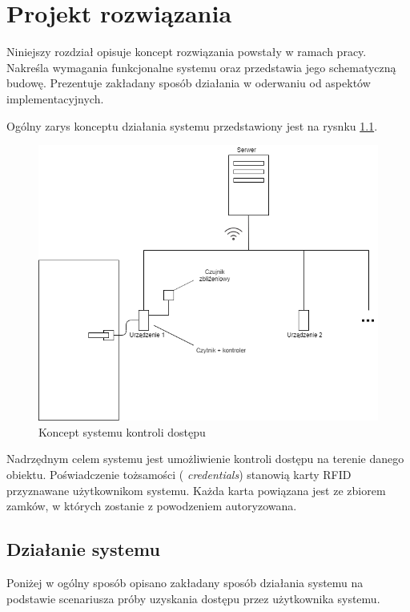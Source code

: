 \chapter{Projekt rozwiązania}
\label{chap:hl-arch}

        Niniejszy rozdział opisuje koncept rozwiązania powstały w ramach pracy. Nakreśla wymagania funkcjonalne systemu oraz przedstawia jego schematyczną budowę. Prezentuje zakładany sposób działania w oderwaniu od aspektów implementacyjnych.

        Ogólny zarys konceptu działania systemu przedstawiony jest na rysnku \ref{fig:door}.

        \begin{figure}[]
                \includegraphics[width=\linewidth]{chapters/images/door2.png}
                \caption{Koncept systemu kontroli dostępu}
                \label{fig:door}
        \end{figure}

        Nadrzędnym celem systemu jest umożliwienie kontroli dostępu na terenie danego obiektu. Poświadczenie tożsamości ( \textit{credentials}) stanowią karty RFID przyznawane użytkownikom systemu. Każda karta powiązana jest ze zbiorem zamków, w których zostanie z powodzeniem autoryzowana.

        \section{Działanie systemu}
                Poniżej w ogólny sposób opisano zakładany sposób działania systemu na podstawie scenariusza próby uzyskania dostępu przez użytkownika systemu.

